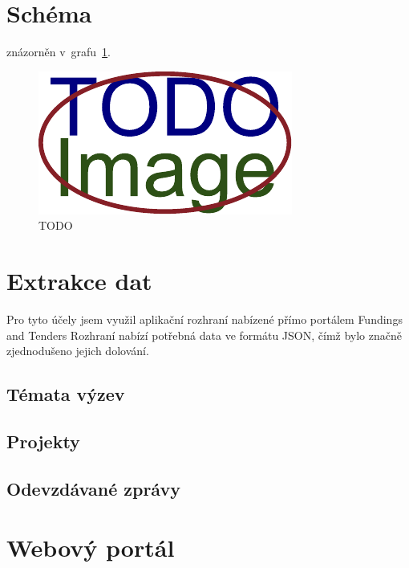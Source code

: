 \section{Schéma}
\blindtext znázorněn v~grafu~\ref{img:scheme}.

\begin{figure}[H]
	\centering
	\includegraphics[width=\textwidth]{obrazky-figures/placeholder.pdf}
	\caption{TODO}
	\label{img:scheme}
\end{figure}

\blindtext[2]

\section{Extrakce dat}
\blindtext
Pro tyto účely jsem využil aplikační rozhraní nabízené přímo portálem Fundings and Tenders %
Rozhraní nabízí potřebná data ve formátu JSON, čímž bylo značně zjednodušeno jejich dolování.

\subsection{Témata výzev}
\blindtext

\subsection{Projekty}
\blindtext

\subsection{Odevzdávané zprávy}
\blindtext



\section{Webový portál}
\blindtext

